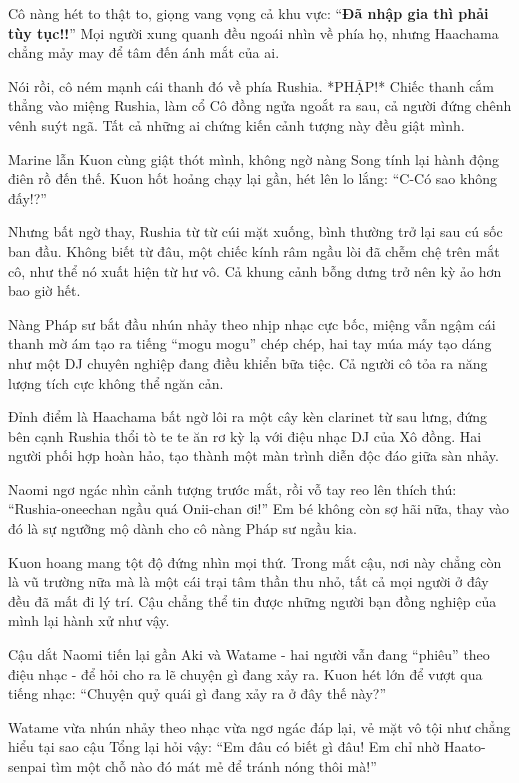 \documentclass[../main.tex]{subfiles}
\begin{document}
Cô nàng hét to thật to, giọng vang vọng cả khu vực: ``\textbf{Đã nhập gia thì phải tùy tục!!}'' Mọi người xung quanh đều ngoái nhìn về phía họ, nhưng Haachama chẳng mảy may để tâm đến ánh mắt của ai.

Nói rồi, cô ném mạnh cái thanh đó về phía Rushia. *PHẬP!* Chiếc thanh cắm thẳng vào miệng Rushia, làm cổ Cô đồng ngửa ngoắt ra sau, cả người đứng chênh vênh suýt ngã. Tất cả những ai chứng kiến cảnh tượng này đều giật mình.


Marine lẫn Kuon cùng giật thót mình, không ngờ nàng Song tính lại hành động điên rồ đến thế. Kuon hốt hoảng chạy lại gần, hét lên lo lắng: ``C-Có sao không đấy!?''

Nhưng bất ngờ thay, Rushia từ từ cúi mặt xuống, bình thường trở lại sau cú sốc ban đầu. Không biết từ đâu, một chiếc kính râm ngầu lòi đã chễm chệ trên mắt cô, như thể nó xuất hiện từ hư vô. Cả khung cảnh bỗng dưng trở nên kỳ ảo hơn bao giờ hết.

Nàng Pháp sư bắt đầu nhún nhảy theo nhịp nhạc cực bốc, miệng vẫn ngậm cái thanh mờ ám tạo ra tiếng ``mogu mogu'' chép chép, hai tay múa máy tạo dáng như một DJ chuyên nghiệp đang điều khiển bữa tiệc. Cả người cô tỏa ra năng lượng tích cực không thể ngăn cản.

Đỉnh điểm là Haachama bất ngờ lôi ra một cây kèn clarinet từ sau lưng, đứng bên cạnh Rushia thổi tò te te ăn rơ kỳ lạ với điệu nhạc DJ của Xô đồng. Hai người phối hợp hoàn hảo, tạo thành một màn trình diễn độc đáo giữa sàn nhảy.


Naomi ngơ ngác nhìn cảnh tượng trước mắt, rồi vỗ tay reo lên thích thú: ``Rushia-oneechan ngầu quá Onii-chan ơi!'' Em bé không còn sợ hãi nữa, thay vào đó là sự ngưỡng mộ dành cho cô nàng Pháp sư ngầu kia.

Kuon hoang mang tột độ đứng nhìn mọi thứ. Trong mắt cậu, nơi này chẳng còn là vũ trường nữa mà là một cái trại tâm thần thu nhỏ, tất cả mọi người ở đây đều đã mất đi lý trí. Cậu chẳng thể tin được những người bạn đồng nghiệp của mình lại hành xử như vậy.

Cậu dắt Naomi tiến lại gần Aki và Watame - hai người vẫn đang ``phiêu'' theo điệu nhạc - để hỏi cho ra lẽ chuyện gì đang xảy ra. Kuon hét lớn để vượt qua tiếng nhạc: ``Chuyện quỷ quái gì đang xảy ra ở đây thế này?''

Watame vừa nhún nhảy theo nhạc vừa ngơ ngác đáp lại, vẻ mặt vô tội như chẳng hiểu tại sao cậu Tổng lại hỏi vậy: ``Em đâu có biết gì đâu! Em chỉ nhờ Haato-senpai tìm một chỗ nào đó mát mẻ để tránh nóng thôi mà!''
\end{document}
